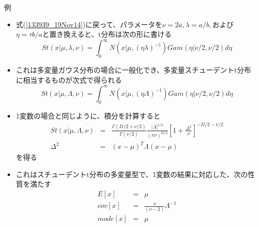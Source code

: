 \begin{frame}{例}
 \begin{itemize}
	\item 式(\ref{133939_19Nov14})に戻って、パラメータを$\nu=2a,\lambda=a/b,$および$\eta=\tau b/a$と置き換えると、t分布は次の形に書ける
				\begin{equation}
				 St(x|\mu,\lambda,\nu) = \int_{0}^{\infty}N(x|\mu, (\eta\lambda)^{-1})Gam(\eta|\nu/2,\nu/2)d\eta
				\end{equation}
	\item これは多変量ガウス分布の場合に一般化でき、多変量スチューデントt分布に相当するものが次式で得られる
				\begin{equation}
				  St(x|\mu,\Lambda,\nu) = \int_{0}^{\infty}N(x|\mu, (\eta\Lambda)^{-1})Gam(\eta|\nu/2,\nu/2)d\eta
				\end{equation}
	\item 1変数の場合と同じように、積分を計算すると
				\begin{eqnarray}
				 St(x|\mu,\Lambda,\nu) &=& \frac{\Gamma(D/2+\nu/2)}{\Gamma(\nu/2)}\frac{|\Lambda|^{1/2}}{(\pi\nu)^{D/2}}[1+\frac{\Delta^2}{\nu}]^{-D/2-\nu/2} \\
				 \Delta^2&= & (x-\mu)^T\Lambda(x-\mu)
				\end{eqnarray}
				を得る
	\item これはスチューデントt分布の多変量型で、1変数の結果に対応した、次の性質を満たす
				\begin{eqnarray}
				 E[x]&=&\mu\\
				 cov[x]&=&\frac{\nu}{(\nu-2)}\Lambda^{-1}\\
				 mode[x]& =& \mu
				\end{eqnarray}
 \end{itemize}
\end{frame}
